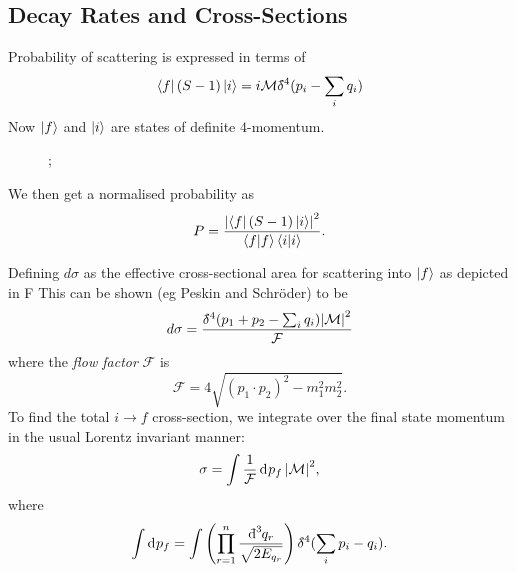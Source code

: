 \subsection*{Decay Rates and Cross-Sections}%

Probability of scattering is expressed in terms of 
\begin{equation}
  \bra{f} (S-1) \ket{i} = i \mathcal{M} \bdelta^4 (p_i - \sum_i q_i)
\end{equation}
Now $\ket{f}$ and $\ket{i}$ are states of definite $4$-momentum.
\begin{figure}[htbp]
  \centering
  ;
  \caption{}
  \label{fig:12-2}
\end{figure}
We then get a normalised probability as
\begin{equation}
  P = \frac{\abs{\bra{f}(S-1)\ket{i}}^2}{\bra{f}\ket{f}\bra{i}\ket{i}}.
\end{equation}

Defining $d\sigma$ as the effective cross-sectional area for scattering into $\ket{f}$ as depicted in F%
This can be shown (eg Peskin and Schröder) to be
\begin{equation}
  d\sigma = \frac{\bdelta^4 (p_1 + p_2 - \sum_i q_i) \abs{\mathcal{M}}^2}{\mathcal{F}}
\end{equation}
where the \emph{flow factor} $\mathcal{F}$ is 
\begin{equation}
  \mathcal{F} = 4 \sqrt{(p_1 \cdot p_2)^2 - m_1^2 m_2^2}.
\end{equation}
To find the total $i \to f$ cross-section, we integrate over the final state momentum in the usual Lorentz invariant manner:
\begin{equation}
  \sigma = \int \frac{1}{\mathcal{F}} \dd[]{p_f} \abs{\mathcal{M}}^2,
\end{equation}
where 
\begin{equation}
  \int \dd[]{p_f} = \int \left( \prod_{r=1}^n \frac{\bdd[3]{q_r}}{\sqrt{2E_{q_r}}} \right) \bdelta^4( \sum_i p_i - q_i).
\end{equation}
